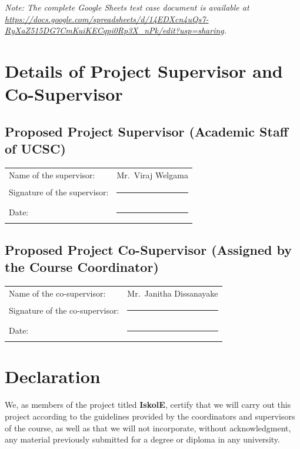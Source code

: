 \documentclass[12pt, a4paper]{report}
\begin{document}
\noindent\textit{Note: The complete Google Sheets test case document is available at \url{https://docs.google.com/spreadsheets/d/14EDXcn4uQs7-RyXaZ515DG7CmKuiKECqpi0Rp3X_nPk/edit?usp=sharing}.}

\chapter{Details of Project Supervisor and Co-Supervisor}

\section*{Proposed Project Supervisor (Academic Staff of UCSC)}

\noindent
\begin{tabular}{@{} p{6cm} p{8cm} @{}}
Name of the supervisor: & Mr.\ Viraj Welgama \\[1cm]
Signature of the supervisor: & \rule{6cm}{0.4pt} \\[1cm]
Date: & \rule{6cm}{0.4pt} \\
\end{tabular}

\vspace{1cm}

\section*{Proposed Project Co-Supervisor (Assigned by the Course Coordinator)}

\noindent
\begin{tabular}{@{} p{6cm} p{8cm} @{}}
Name of the co-supervisor: & Mr.\ Janitha Dissanayake \\[1cm]
Signature of the co-supervisor: & \rule{6cm}{0.4pt} \\[1cm]
Date: & \rule{6cm}{0.4pt} \\
\end{tabular}

\chapter{Declaration}

We, as members of the project titled \textbf{IskolE}, certify that we will carry out this project according to the guidelines provided by the coordinators and supervisors of the course, as well as that we will not incorporate, without acknowledgment, any material previously submitted for a degree or diploma in any university.
\end{document}
